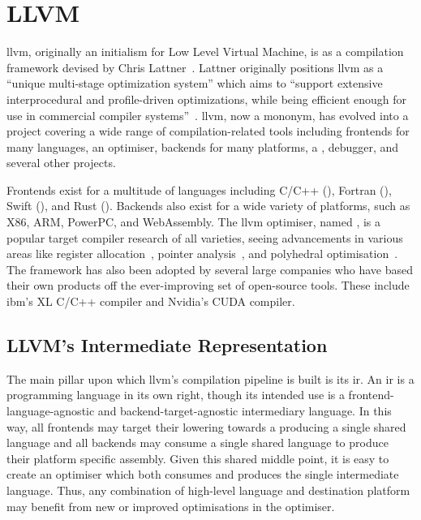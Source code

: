 \documentclass[\main/thesis.tex]{subfiles}
\begin{document}
\section{LLVM}
\label{sec:llvm}
\Gls{llvm}, originally an initialism for Low Level Virtual Machine, is as a compilation framework devised by Chris Lattner~\autocite{lattner2002llvm,lattner2004llvm}.
Lattner originally positions \gls{llvm} as a ``unique multi-stage optimization system'' which aims to ``support extensive interprocedural and profile-driven optimizations, while being efficient enough for use in commercial compiler systems''~\autocite{lattner2002llvm}.
\Gls{llvm}, now a mononym, has evolved into a project covering a wide range of compilation-related tools including frontends for many languages, an optimiser, backends for many platforms, a , debugger, and several other projects.

Frontends exist for a multitude of languages including C/C++ (), Fortran (), Swift (), and Rust ().
Backends also exist for a wide variety of platforms, such as X86, ARM, PowerPC, and WebAssembly.
The \gls{llvm} optimiser, named , is a popular target compiler research of all varieties, seeing advancements in various areas like register allocation~\autocite{lozano2019combinatorial,pereira2008register}, pointer analysis~\autocite{hardekopf2009semi,sui2016interprocedural}, and polyhedral optimisation~\autocite{grosser2011polly,alves2015runtime}.
The framework has also been adopted by several large companies who have based their own products off the ever-improving set of open-source tools.
These include \gls{ibm}'s XL C/C++ compiler and Nvidia's CUDA compiler.

\subsection{LLVM's Intermediate Representation}
\label{sec:ir}
The main pillar upon which \gls{llvm}'s compilation pipeline is built is its \gls{ir}.
An \gls{ir} is a programming language in its own right, though its intended use is a frontend-language-agnostic and backend-target-agnostic intermediary language.
In this way, all frontends may target their \gls{lowering} towards a producing a single shared language and all backends may consume a single shared language to produce their platform specific assembly.
Given this shared middle point, it is easy to create an optimiser which both consumes and produces the single intermediate language.
Thus, any combination of high-level language and destination platform may benefit from new or improved optimisations in the optimiser.
\end{document}

